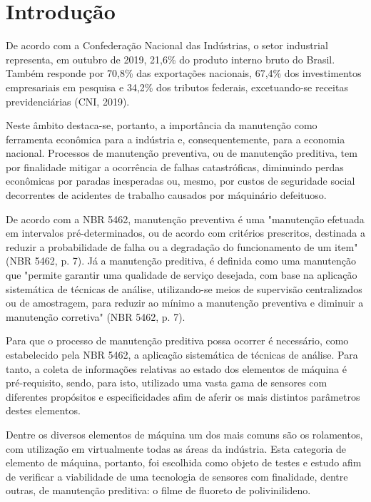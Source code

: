 \documentclass[
	12pt,				
	oneside,			
	a4paper,			
	english,			
	brazil				
	]{abntex2ppgsi}
\begin{document}
\textual




\chapter{Introdução}
De acordo com a Confederação Nacional das Indústrias, o setor industrial representa, em outubro de 2019, 21,6\% do produto interno bruto do Brasil. Também responde por 70,8\% das exportações nacionais, 67,4\% dos investimentos empresariais em pesquisa  e 34,2\% dos tributos federais, excetuando-se receitas previdenciárias (CNI, 2019). 

Neste âmbito destaca-se, portanto, a importância da manutenção como ferramenta econômica para a indústria e, consequentemente, para a economia nacional. Processos de manutenção preventiva, ou de manutenção preditiva, tem por finalidade mitigar a ocorrência de falhas catastróficas, diminuindo perdas econômicas por paradas inesperadas ou, mesmo, por custos de seguridade social decorrentes de acidentes de trabalho causados por máquinário defeituoso.

De acordo com a NBR 5462, manutenção preventiva é uma "manutenção efetuada em intervalos pré-determinados, ou de acordo com critérios prescritos, destinada a reduzir a probabilidade de falha ou a degradação do funcionamento de um item" (NBR 5462, p. 7). Já a manutenção preditiva, é definida como uma manutenção que "permite garantir uma qualidade de serviço desejada, com base na aplicação sistemática de técnicas de análise, utilizando-se meios de supervisão centralizados ou de amostragem, para reduzir ao mínimo a manutenção preventiva e diminuir a manutenção corretiva" (NBR 5462, p. 7). 

Para que o processo de manutenção preditiva possa ocorrer é necessário, como estabelecido pela NBR 5462, a aplicação sistemática de técnicas de análise. Para tanto, a coleta de informações relativas ao estado dos elementos de máquina é pré-requisito, sendo, para isto, utilizado uma vasta gama de sensores com diferentes propósitos e especificidades afim de aferir os mais distintos parâmetros destes elementos. 

Dentre os diversos elementos de máquina um dos mais comuns são os rolamentos, com utilização em virtualmente todas as áreas da indústria. Esta categoria de elemento de máquina, portanto, foi escolhida como objeto de testes e estudo afim de verificar a viabilidade de uma tecnologia  de sensores com finalidade, dentre outras, de manutenção preditiva: o filme de fluoreto de polivinilideno. 
\end{document}
